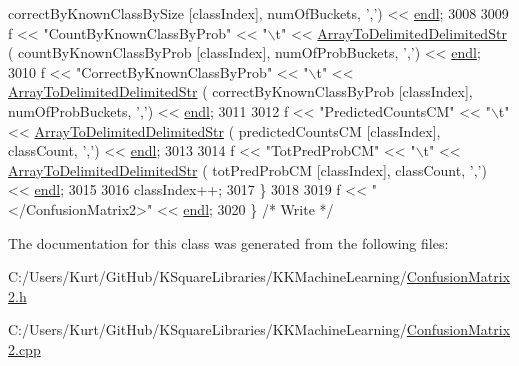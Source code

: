 \begin{DoxyCode}
      correctByKnownClassBySize  [classIndex], numOfBuckets,     \textcolor{charliteral}{','}) << \hyperlink{namespace_k_k_b_ad1f50f65af6adc8fa9e6f62d007818a8}{endl};
3008     
3009     f << \textcolor{stringliteral}{"CountByKnownClassByProb"}    << \textcolor{stringliteral}{"\(\backslash\)t"} << \hyperlink{_confusion_matrix2_8cpp_a5d94b5948f340aaa85dd52d3d259b65e}{ArrayToDelimitedDelimitedStr} (
      countByKnownClassByProb    [classIndex], numOfProbBuckets, \textcolor{charliteral}{','}) << \hyperlink{namespace_k_k_b_ad1f50f65af6adc8fa9e6f62d007818a8}{endl};
3010     f << \textcolor{stringliteral}{"CorrectByKnownClassByProb"}  << \textcolor{stringliteral}{"\(\backslash\)t"} << \hyperlink{_confusion_matrix2_8cpp_a5d94b5948f340aaa85dd52d3d259b65e}{ArrayToDelimitedDelimitedStr} (
      correctByKnownClassByProb  [classIndex], numOfProbBuckets, \textcolor{charliteral}{','}) << \hyperlink{namespace_k_k_b_ad1f50f65af6adc8fa9e6f62d007818a8}{endl};
3011 
3012     f << \textcolor{stringliteral}{"PredictedCountsCM"}          << \textcolor{stringliteral}{"\(\backslash\)t"} << \hyperlink{_confusion_matrix2_8cpp_a5d94b5948f340aaa85dd52d3d259b65e}{ArrayToDelimitedDelimitedStr} (
      predictedCountsCM          [classIndex], classCount,       \textcolor{charliteral}{','}) << \hyperlink{namespace_k_k_b_ad1f50f65af6adc8fa9e6f62d007818a8}{endl};
3013 
3014     f << \textcolor{stringliteral}{"TotPredProbCM"}              << \textcolor{stringliteral}{"\(\backslash\)t"} << \hyperlink{_confusion_matrix2_8cpp_a5d94b5948f340aaa85dd52d3d259b65e}{ArrayToDelimitedDelimitedStr} (
      totPredProbCM              [classIndex], classCount,       \textcolor{charliteral}{','}) << \hyperlink{namespace_k_k_b_ad1f50f65af6adc8fa9e6f62d007818a8}{endl};
3015 
3016     classIndex++;
3017   \}
3018 
3019   f << \textcolor{stringliteral}{"</ConfusionMatrix2>"} << \hyperlink{namespace_k_k_b_ad1f50f65af6adc8fa9e6f62d007818a8}{endl};
3020 \}  \textcolor{comment}{/* Write */}
\end{DoxyCode}


The documentation for this class was generated from the following files\+:\begin{DoxyCompactItemize}
\item 
C\+:/\+Users/\+Kurt/\+Git\+Hub/\+K\+Square\+Libraries/\+K\+K\+Machine\+Learning/\hyperlink{_confusion_matrix2_8h}{Confusion\+Matrix2.\+h}\item 
C\+:/\+Users/\+Kurt/\+Git\+Hub/\+K\+Square\+Libraries/\+K\+K\+Machine\+Learning/\hyperlink{_confusion_matrix2_8cpp}{Confusion\+Matrix2.\+cpp}\end{DoxyCompactItemize}
